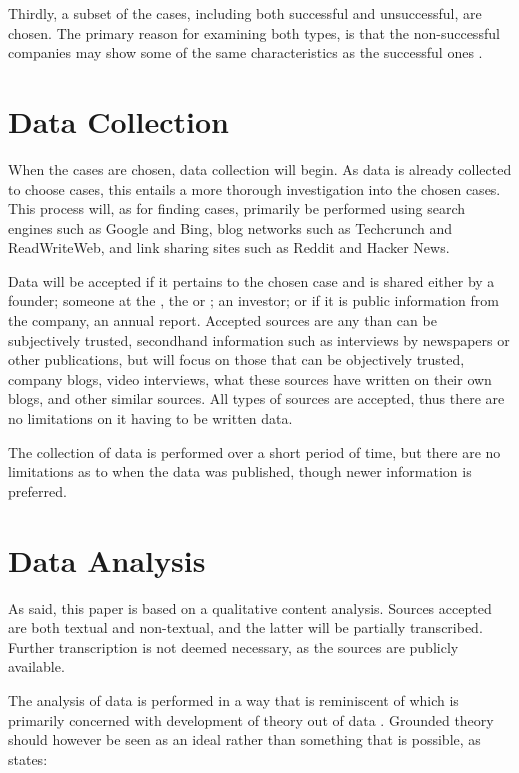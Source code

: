 Thirdly, a subset of the cases, including both successful and unsuccessful, are chosen. The primary reason for examining both types, is that the non-successful companies may show some of the same characteristics as the successful ones \citep{fritz2004}. 

\section{Data Collection}

When the cases are chosen, data collection will begin. As data is already collected to choose cases, this entails a more thorough investigation into the chosen cases. This process will, as for finding cases, primarily be performed using search engines such as Google and Bing, blog networks such as Techcrunch and ReadWriteWeb, and link sharing sites such as Reddit and Hacker News.

Data will be accepted if it pertains to the chosen case and is shared either by a founder; someone at the , \eg the  or ; an investor; or if it is public information from the company, \eg an annual report. Accepted sources are any than can be subjectively trusted, \ie secondhand information such as interviews by newspapers or other publications, but will focus on those that can be objectively trusted, \eg company blogs, video interviews, what these sources have written on their own blogs, and other similar sources. All types of sources are accepted, thus there are no limitations on it having to be written data.

The collection of data is performed over a short period of time, but there are no limitations as to when the data was published, though newer information is preferred.

\section{Data Analysis}

As said, this paper is based on a qualitative content analysis. Sources accepted are both textual and non-textual, and the latter will be partially transcribed. Further transcription is not deemed necessary, as the sources are publicly available. 

The analysis of data is performed in a way that is reminiscent of  which is primarily concerned with development of theory out of data \citep{bryman2008}. Grounded theory should however be seen as an ideal rather than something that is possible, as \citet{bryman2008} states:  

